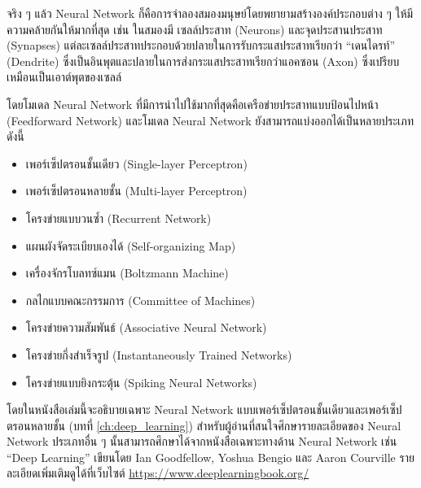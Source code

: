 จริง ๆ แล้ว Neural Network ก็คือการจำลองสมองมนุษย์โดยพยายามสร้างองค์ประกอบต่าง ๆ ให้มีความคล้ายกันให้มากที่สุด เช่น ในสมองมี%
เซลล์ประสาท (Neurons) และจุดประสานประสาท (Synapses) แต่ละเซลล์ประสาทประกอบด้วยปลายในการรับกระแสประสาทเรียกว่า 
\enquote{เดนไดรท์} (Dendrite) ซึ่งเป็นอินพุตและปลายในการส่งกระแสประสาทเรียกว่าแอคซอน (Axon) ซึ่งเปรียบเหมือนเป็นเอาต์พุตของเซลล์

โดยโมเดล Neural Network ที่มีการนำไปใช้มากที่สุดคือเครือข่ายประสาทแบบป้อนไปหน้า (Feedforward Network) และโมเดล Neural Network 
ยังสามารถแบ่งออกได้เป็นหลายประเภท ดังนี้

\begin{itemize}
    \item เพอร์เซ็ปตรอนชั้นเดียว (Single-layer Perceptron)
    
    \item เพอร์เซ็ปตรอนหลายชั้น (Multi-layer Perceptron)
    
    \item โครงข่ายแบบวนซ้ำ (Recurrent Network)
    
    \item แผนผังจัดระเบียบเองได้ (Self-organizing Map)
    
    \item เครื่องจักรโบลทซ์แมน (Boltzmann Machine)
    
    \item กลไกแบบคณะกรรมการ (Committee of Machines)
    
    \item โครงข่ายความสัมพันธ์ (Associative Neural Network)
    
    \item โครงข่ายกึ่งสำเร็จรูป (Instantaneously Trained Networks)
    
    \item โครงข่ายแบบยิงกระตุ้น (Spiking Neural Networks) 
\end{itemize}

โดยในหนังสือเล่มนี้จะอธิบายเฉพาะ Neural Network แบบเพอร์เซ็ปตรอนชั้นเดียวและเพอร์เซ็ปตรอนหลายชั้น (บทที่ \ref{ch:deep_learning}) 
สำหรับผู้อ่านที่สนใจศึกษารายละเอียดของ Neural Network ประเภทอื่น ๆ นั้นสามารถศึกษาได้จากหนังสือเฉพาะทางด้าน Neural Network เช่น 
\enquote{Deep Learning} เขียนโดย Ian Goodfellow, Yoshua Bengio และ Aaron Courville\autocite{Goodfellow-et-al-2016} 
รายละเอียดเพิ่มเติมดูได้ที่เว็บไซต์ \url{https://www.deeplearningbook.org/}
